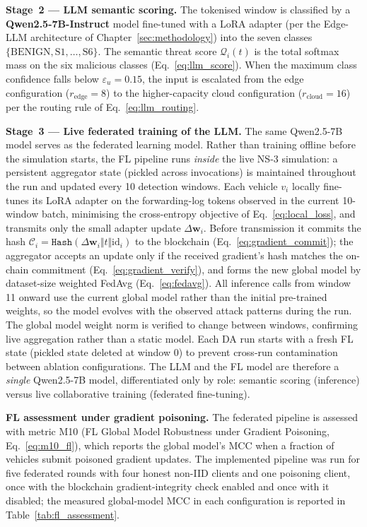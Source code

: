 \documentclass[12pt, a4paper]{report}
\newcommand{\mypar}{\vspace{0.8em}\noindent}
\begin{document}
\mypar
\textbf{Stage~2 --- LLM semantic scoring.} The tokenised window is classified by
a \textbf{Qwen2.5-7B-Instruct} model fine-tuned with a LoRA adapter
(per the Edge-LLM architecture of Chapter~\ref{sec:methodology}) into the seven
classes $\{\mathrm{BENIGN}, \mathrm{S1}, \ldots, \mathrm{S6}\}$. The semantic
threat score $\mathcal{Q}_i(t)$ is the total softmax mass on the six malicious
classes (Eq.~\eqref{eq:llm_score}). When the maximum class confidence falls below
$\varepsilon_u = 0.15$, the input is escalated from the edge configuration
($r_{\text{edge}}=8$) to the higher-capacity cloud configuration
($r_{\text{cloud}}=16$) per the routing rule of Eq.~\eqref{eq:llm_routing}.

\mypar
\textbf{Stage~3 --- Live federated training of the LLM.}
The same Qwen2.5-7B model serves as the federated learning model.
Rather than training offline before the simulation starts, the FL
pipeline runs \emph{inside} the live NS-3 simulation: a persistent
aggregator state (pickled across invocations) is maintained throughout
the run and updated every 10 detection windows. Each vehicle $v_i$
locally fine-tunes its LoRA adapter on the forwarding-log tokens
observed in the current 10-window batch, minimising the cross-entropy
objective of Eq.~\eqref{eq:local_loss}, and transmits only the
small adapter update $\Delta\mathbf{w}_i$. Before transmission it
commits the hash $\mathcal{C}_i =
\mathtt{Hash}(\Delta\mathbf{w}_i \Vert t \Vert \mathrm{id}_i)$ to
the blockchain (Eq.~\eqref{eq:gradient_commit}); the aggregator
accepts an update only if the received gradient's hash matches the
on-chain commitment (Eq.~\eqref{eq:gradient_verify}), and forms the
new global model by dataset-size weighted FedAvg
(Eq.~\eqref{eq:fedavg}). All inference calls from window 11 onward
use the current global model rather than the initial pre-trained
weights, so the model evolves with the observed attack patterns during
the run. The global model weight norm is verified to change between
windows, confirming live aggregation rather than a static model. Each
DA run starts with a fresh FL state (pickled state deleted at window 0)
to prevent cross-run contamination between ablation configurations.
The LLM and the FL model are therefore a \emph{single} Qwen2.5-7B
model, differentiated only by role: semantic scoring (inference)
versus live collaborative training (federated fine-tuning).

\mypar
\textbf{FL assessment under gradient poisoning.}
The federated pipeline is assessed with metric M10 (FL Global Model Robustness
under Gradient Poisoning, Eq.~\eqref{eq:m10_fl}), which reports the global
model's MCC when a fraction of vehicles submit poisoned gradient updates. The
implemented pipeline was run for five federated rounds with four honest non-IID
clients and one poisoning client, once with the blockchain gradient-integrity
check enabled and once with it disabled; the measured global-model MCC in each
configuration is reported in Table~\ref{tab:fl_assessment}.
\end{document}
